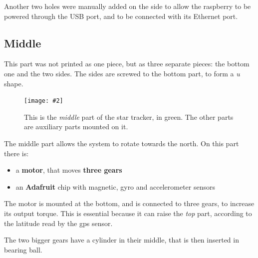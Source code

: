 \documentclass[]{article}
\newcommand{\inctrimpic}[2][1]
{\texttt{[image: \#2]}}
\begin{document}
Another two holes were manually added on the side to allow the raspberry to be powered through the USB port, and to be connected with its Ethernet port. 

\subsection{Middle}

This part was not printed as one piece, but as three separate pieces: the bottom one and the two sides. The sides are screwed to the bottom part, to form a \textit{u} shape. 

\begin{figure}[H]
	\centering
	\inctrimpic[0.7]{images/design/middle/middle_iso.pdf}
	\caption{This is the \textit{middle} part of the star tracker, in green. The other parts are auxiliary parts mounted on it.}
	\label{fig:middle_iso}
\end{figure}

The middle part allows the system to rotate towards the north. On this part there is:

\begin{itemize}
	\item a \textbf{motor}, that moves \textbf{three gears}
	\item an \textbf{Adafruit} chip with magnetic, gyro and accelerometer sensors
\end{itemize}

The motor is mounted at the bottom, and is connected to three gears, to increase its output torque. This is essential because it can raise the \textit{top} part, according to the latitude read by the gps sensor. 

The two bigger gears have a cylinder in their middle, that is then inserted in bearing ball.
\end{document}
